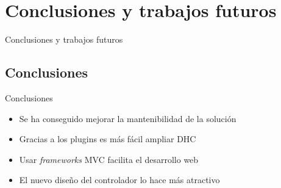 \documentclass[12pt]{beamer}
\newcommand{\mysection}[1]{\begin{frame}{}\begin{center}\Huge #1\end{center}\end{frame}}
\begin{document}




\section{Conclusiones y trabajos futuros}
\mysection{Conclusiones y trabajos futuros}

\subsection{Conclusiones}
\begin{frame}{Conclusiones}
	\begin{itemize}
		\item Se ha conseguido mejorar la mantenibilidad de la solución
		\item Gracias a los plugins es más fácil ampliar DHC
		\item Usar \emph{frameworks} MVC facilita el desarrollo web
		\item El nuevo diseño del controlador lo hace más atractivo
	\end{itemize}
\end{frame}
\end{document}
